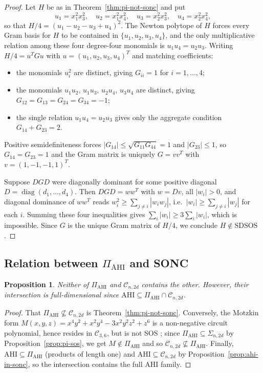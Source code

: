\documentclass[12pt]{elsarticle}
\newtheorem{proposition}[theorem]{Proposition}
\theoremstyle{definition}
\newcommand{\AHI}{\mathrm{AHI}}
\newcommand{\PiAHI}{\Pi_{\AHI}}
\newcommand{\SONC}{\mathcal{C}}
\newcommand{\SDSOS}{\mathrm{SDSOS}}
\begin{document}
\begin{proof}
Let $H$ be as in Theorem~\ref{thm:pi-not-sonc} and put
\[
u_1=x_1^2x_3^2,\quad u_2=x_1^2x_4^2,\quad u_3=x_2^2x_3^2,\quad u_4=x_2^2x_4^2,
\]
so that $H/4 = (u_1-u_2-u_3+u_4)^2$. The Newton polytope of $H$ forces every Gram basis for $H$ to be contained in $\{u_1,u_2,u_3,u_4\}$, and the only multiplicative relation among these four degree-four monomials is $u_1u_4=u_2u_3$. Writing $H/4 = u^{T}Gu$ with $u=(u_1,u_2,u_3,u_4)^{T}$ and matching coefficients:
\begin{itemize}
\item the monomials $u_i^2$ are distinct, giving $G_{ii}=1$ for $i=1,\dots,4$;
\item the monomials $u_1u_2$, $u_1u_3$, $u_2u_4$, $u_3u_4$ are distinct, giving $G_{12}=G_{13}=G_{24}=G_{34}=-1$;
\item the single relation $u_1u_4=u_2u_3$ gives only the aggregate condition $G_{14}+G_{23}=2$.
\end{itemize}
Positive semidefiniteness forces $|G_{14}|\le\sqrt{G_{11}G_{44}}=1$ and $|G_{23}|\le 1$, so $G_{14}=G_{23}=1$ and the Gram matrix is uniquely $G=vv^{T}$ with $v=(1,-1,-1,1)^{T}$.

Suppose $DGD$ were diagonally dominant for some positive diagonal $D=\operatorname{diag}(d_1,\dots,d_4)$. Then $DGD=ww^{T}$ with $w=Dv$, all $|w_i|>0$, and diagonal dominance of $ww^{T}$ reads $w_i^2\ge\sum_{j\ne i}|w_i w_j|$, i.e.\ $|w_i|\ge\sum_{j\ne i}|w_j|$ for each $i$. Summing these four inequalities gives $\sum_i |w_i| \ge 3\sum_i |w_i|$, which is impossible. Since $G$ is the unique Gram matrix of $H/4$, we conclude $H\notin\SDSOS$.
\end{proof}

\subsection{Relation between \texorpdfstring{$\PiAHI$}{Pi AHI} and SONC}\label{subsec:relation}

\begin{proposition}\label{prop:neither-contains}
Neither of $\PiAHI$ and $\SONC_{n,2d}$ contains the other. However, their intersection is full-dimensional since $\AHI\subseteq \PiAHI\cap\SONC_{n,2d}$.
\end{proposition}

\begin{proof}
That $\PiAHI\not\subseteq\SONC_{n,2d}$ is Theorem~\ref{thm:pi-not-sonc}. Conversely, the Motzkin form $M(x,y,z)=x^4y^2+x^2y^4-3x^2y^2z^2+z^6$ is a non-negative circuit polynomial, hence resides in $\SONC_{3,6}$, but is not SOS \citep{motzkin1967arithmetic}; since $\PiAHI\subseteq\Sigma_{n,2d}$ by Proposition~\ref{prop:pi-sos}, we get $M\notin\PiAHI$ and so $\SONC_{n,2d}\not\subseteq\PiAHI$. Finally, $\AHI\subseteq\PiAHI$ (products of length one) and $\AHI\subseteq\SONC_{n,2d}$ by Proposition~\ref{prop:ahi-in-sonc}, so the intersection contains the full AHI family.
\end{proof}
\end{document}
